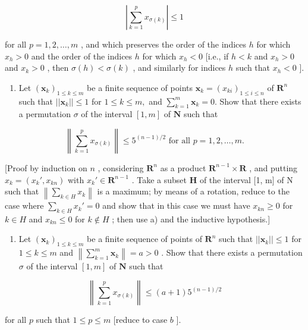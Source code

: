 \[
\left| \sum_ {k = 1} ^ {p} x _ {\sigma (k)} \right| \leqslant 1
\]

for all \(p = 1, 2, \ldots, m\) , and which preserves the order of the indices \(h\) for which \(x_h > 0\) and the order of the indices \(h\) for which \(x_h < 0\) {[}i.e., if \(h < k\) and \(x_h > 0\) and \(x_k > 0\) , then \(\sigma(h) < \sigma(k)\) , and similarly for indices \(h\) such that \(x_h < 0\) {]}.

\begin{enumerate}
\def\labelenumi{\alph{enumi})}
\setcounter{enumi}{1}
\tightlist
\item
  Let \((\pmb{x}_k)_{1\leqslant k\leqslant m}\) be a finite sequence of points \(\pmb{x}_k = (x_{ki})_{1\leqslant i\leqslant n}\) of \(\mathbf{R}^n\) such that \(||\pmb{x}_k||\leqslant 1\) for \(1\leqslant k\leqslant m,\) and \(\sum_{k = 1}^{m}\pmb{x}_k = 0.\) Show that there exists a permutation \(\sigma\) of the interval \([1, m]\) of \(\mathbf{N}\) such that
\end{enumerate}

\[
\left\| \sum_ {k = 1} ^ {p} x _ {\sigma (k)} \right\| \leqslant 5 ^ {(n - 1) / 2} \text { for   all } p = 1, 2, \dots , m.
\]

{[}Proof by induction on \(n\) , considering \(\mathbf{R}^n\) as a product \(\mathbf{R}^{n-1} \times \mathbf{R}\) , and putting \(x_k = (x_k', x_{kn})\) with \(x_k' \in \mathbf{R}^{n-1}\) . Take a subset \(\mathbf{H}\) of the interval {[}1, m{]} of N such that \(\left\|\sum_{k\in H}x_{k}\right\|\) is a maximum; by means of a rotation, reduce to the case where \(\sum_{k\in H}x_{k}'=0\) and show that in this case we must have \(x_{kn}\geqslant0\) for \(k\in H\) and \(x_{kn}\leqslant0\) for \(k\notin H\) ; then use a) and the inductive hypothesis.{]}

\begin{enumerate}
\def\labelenumi{\alph{enumi})}
\setcounter{enumi}{2}
\tightlist
\item
  Let \((\pmb{x}_k)_{1 \leqslant k \leqslant m}\) be a finite sequence of points of \(\mathbf{R}^n\) such that \(||\pmb{x}_k|| \leqslant 1\) for \(1 \leqslant k \leqslant m\) and \(\left\| \sum_{k=1}^{m} \pmb{x}_k \right\| = a > 0\) . Show that there exists a permutation \(\sigma\) of the interval \([1, m]\) of \(\mathbf{N}\) such that
\end{enumerate}

\[
\left\| \sum_ {k = 1} ^ {p} x _ {\sigma (k)} \right\| \leqslant (a + 1) 5 ^ {(n - 1) / 2}
\]

for all \(p\) such that \(1 \leqslant p \leqslant m\) {[}reduce to case \(b\) {]}.

